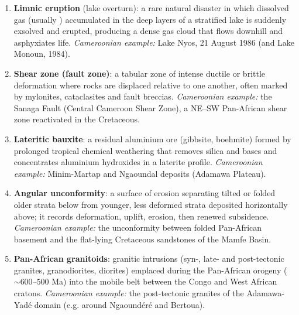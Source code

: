 \documentclass[11pt]{article}
\begin{document}
\begin{corrige}
\begin{enumerate}
\item \textbf{Limnic eruption} (lake overturn): a rare natural disaster in which dissolved gas (usually ) accumulated in the deep layers of a stratified lake is suddenly exsolved and erupted, producing a dense gas cloud that flows downhill and asphyxiates life. \emph{Cameroonian example:} Lake Nyos, 21 August 1986 (and Lake Monoun, 1984).
\item \textbf{Shear zone (fault zone)}: a tabular zone of intense ductile or brittle deformation where rocks are displaced relative to one another, often marked by mylonites, cataclasites and fault breccias. \emph{Cameroonian example:} the Sanaga Fault (Central Cameroon Shear Zone), a NE–SW Pan-African shear zone reactivated in the Cretaceous.
\item \textbf{Lateritic bauxite}: a residual aluminium ore (gibbsite, boehmite) formed by prolonged tropical chemical weathering that removes silica and bases and concentrates aluminium hydroxides in a laterite profile. \emph{Cameroonian example:} Minim-Martap and Ngaoundal deposits (Adamawa Plateau).
\item \textbf{Angular unconformity}: a surface of erosion separating tilted or folded older strata below from younger, less deformed strata deposited horizontally above; it records deformation, uplift, erosion, then renewed subsidence. \emph{Cameroonian example:} the unconformity between folded Pan-African basement and the flat-lying Cretaceous sandstones of the Mamfe Basin.
\item \textbf{Pan-African granitoids}: granitic intrusions (syn-, late- and post-tectonic granites, granodiorites, diorites) emplaced during the Pan-African orogeny ($\sim 600$–$500$ Ma) into the mobile belt between the Congo and West African cratons. \emph{Cameroonian example:} the post-tectonic granites of the Adamawa-Yadé domain (e.g. around Ngaoundéré and Bertoua).
\end{enumerate}
\end{corrige}
\end{document}
